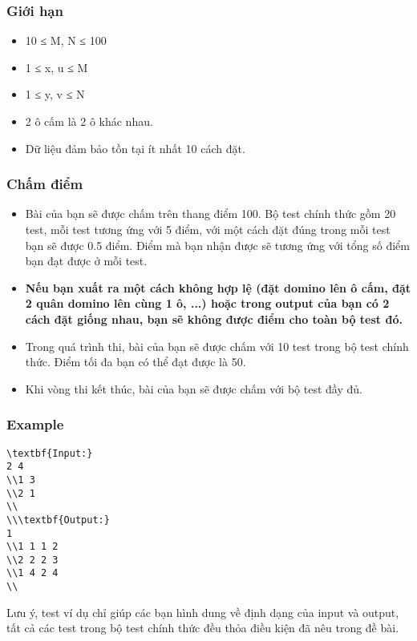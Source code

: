 \subsubsection{   Giới hạn  }
\begin{itemize}
	\item     10 ≤ M, N ≤ 100   
	\item     1 ≤ x, u ≤ M   
	\item     1 ≤ y, v ≤ N   
	\item     2 ô cấm là 2 ô khác nhau.   
	\item     Dữ liệu đảm bảo tồn tại ít nhất 10 cách đặt.   
\end{itemize}

\subsubsection{   Chấm điểm  }
\begin{itemize}
	\item     Bài của bạn sẽ được chấm trên thang điểm 100. Bộ test chính thức gồm 20 test, mỗi test tương ứng với 5 điểm, với một cách đặt đúng trong mỗi test bạn sẽ được 0.5 điểm. Điểm mà bạn nhận được sẽ tương ứng với tổng số điểm bạn đạt được ở mỗi test.   
	\item \textbf{     Nếu bạn xuất ra một cách không hợp lệ (đặt domino lên ô cấm, đặt 2  quân domino lên cùng 1 ô, ...) hoặc trong output của bạn có 2 cách đặt  giống nhau, bạn sẽ không được điểm cho toàn bộ test đó.    }
	\item     Trong quá trình thi, bài của bạn sẽ được chấm với 10 test trong bộ test chính thức. Điểm tối đa bạn có thể đạt được là 50.   
	\item     Khi vòng thi kết thúc, bài của bạn sẽ được chấm với bộ test đầy đủ.   
\end{itemize}
\begin{itemize}
\end{itemize}
\begin{itemize}
\end{itemize}

\subsubsection{   Example  }
\begin{verbatim}
\textbf{Input:}
2 4
\\1 3
\\2 1
\\
\\\textbf{Output:}
1
\\1 1 1 2
\\2 2 2 3
\\1 4 2 4
\\\end{verbatim}

   Lưu ý, test ví dụ chỉ giúp các bạn hình dung về định dạng của input và output, tất cả các test trong bộ test chính thức đều thỏa điều kiện đã nêu trong đề bài.  